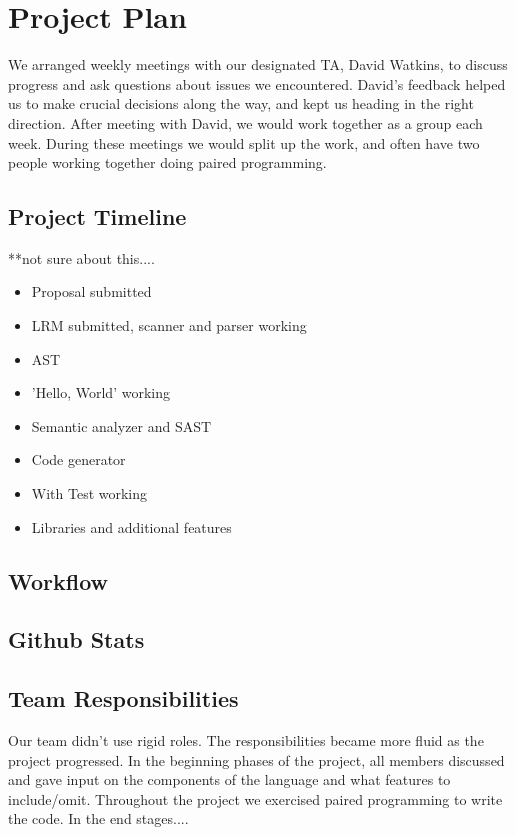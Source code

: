\documentclass{article}
\begin{document}
\newpage

\section{Project Plan}
We arranged weekly meetings with our designated TA, David Watkins, to discuss progress and ask questions about issues we encountered. David's feedback helped us to make crucial decisions along the way, and kept us heading in the right direction. After meeting with David, we would work together as a group each week. During these meetings we would split up the work, and often have two people working together doing paired programming. 

\subsection{Project Timeline}
**not sure about this....
\begin{itemize}
\item{Proposal submitted}
\item{LRM submitted, scanner and parser working}
\item{AST}
\item{'Hello, World' working}
\item{Semantic analyzer and SAST}
\item{Code generator}
\item{With Test working}
\item{Libraries and additional features}
\end{itemize}

\subsection{Workflow}

\subsection{Github Stats} 

\subsection{Team Responsibilities}
Our team didn't use rigid roles. The responsibilities became more fluid as the project progressed. In the beginning phases of the project, all members discussed and gave input on the components of the language and what features to include/omit. Throughout the project we exercised paired programming to write the code. In the end stages....
\end{document}

